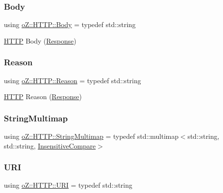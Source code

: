 \subsubsection{\texorpdfstring{Body}{Body}}
{\footnotesize\ttfamily using \mbox{\hyperlink{namespaceo_z_1_1_h_t_t_p_a270c38b9f9b6228ce430fda6d5b150d6}{o\+Z\+::\+H\+T\+T\+P\+::\+Body}} = typedef std\+::string}



\mbox{\hyperlink{namespaceo_z_1_1_h_t_t_p}{H\+T\+TP}} Body (\mbox{\hyperlink{classo_z_1_1_h_t_t_p_1_1_response}{Response}}) 

\mbox{\label{namespaceo_z_1_1_h_t_t_p_afcd8b91e5e8a7b6df0a7b3b298ec3965}} 
\subsubsection{\texorpdfstring{Reason}{Reason}}
{\footnotesize\ttfamily using \mbox{\hyperlink{namespaceo_z_1_1_h_t_t_p_afcd8b91e5e8a7b6df0a7b3b298ec3965}{o\+Z\+::\+H\+T\+T\+P\+::\+Reason}} = typedef std\+::string}



\mbox{\hyperlink{namespaceo_z_1_1_h_t_t_p}{H\+T\+TP}} Reason (\mbox{\hyperlink{classo_z_1_1_h_t_t_p_1_1_response}{Response}}) 

\mbox{\label{namespaceo_z_1_1_h_t_t_p_a339aac279d709cfa16148ad073500fc1}} 
\subsubsection{\texorpdfstring{StringMultimap}{StringMultimap}}
{\footnotesize\ttfamily using \mbox{\hyperlink{namespaceo_z_1_1_h_t_t_p_a339aac279d709cfa16148ad073500fc1}{o\+Z\+::\+H\+T\+T\+P\+::\+String\+Multimap}} = typedef std\+::multimap$<$std\+::string, std\+::string, \mbox{\hyperlink{structo_z_1_1_h_t_t_p_1_1_insensitive_compare}{Insensitive\+Compare}}$>$}

\mbox{\label{namespaceo_z_1_1_h_t_t_p_a6d47156e2eac27750983fc1b54bd2ff8}} 
\subsubsection{\texorpdfstring{URI}{URI}}
{\footnotesize\ttfamily using \mbox{\hyperlink{namespaceo_z_1_1_h_t_t_p_a6d47156e2eac27750983fc1b54bd2ff8}{o\+Z\+::\+H\+T\+T\+P\+::\+U\+RI}} = typedef std\+::string}



